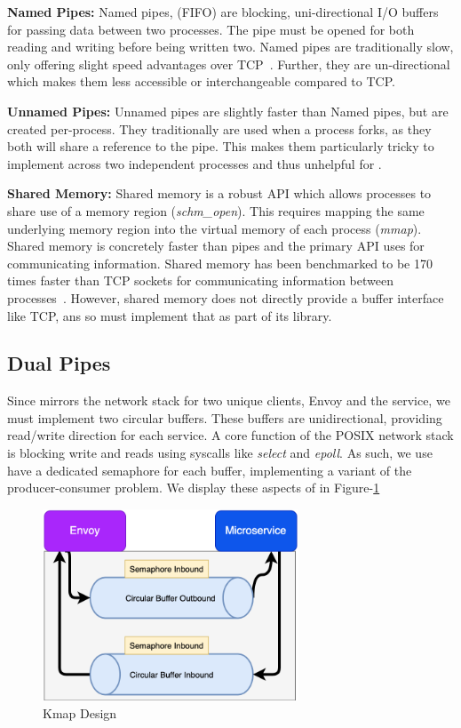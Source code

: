 \textbf{Named Pipes:}
Named pipes, (FIFO) are blocking, uni-directional I/O buffers for passing data between two processes.
The pipe must be opened for both reading and writing before being written two.
Named pipes are traditionally slow, only offering slight speed advantages over TCP~\cite{ipcperf}.
Further, they are un-directional which makes them less accessible or interchangeable compared to TCP.

\textbf{Unnamed Pipes:}
Unnamed pipes are slightly faster than Named pipes, but are created per-process.
They traditionally are used when a process forks, as they both will share a reference to the pipe.
This makes them particularly tricky to implement across two independent processes and thus unhelpful for \sysname.

\textbf{Shared Memory:}
Shared memory is a robust API which allows processes to share use of a memory region (\textit{schm\_open}).
This requires mapping the same underlying memory region into the virtual memory of each process (\textit{mmap}).
Shared memory is concretely faster than pipes and the primary API \sysname uses for communicating information.
Shared memory has been benchmarked to be 170 times faster than TCP sockets for communicating information between processes~\cite{ipcperf}.
However, shared memory does not directly provide a buffer interface like TCP, ans so \sysname must implement that as part of its library.

\subsection{Dual Pipes}
Since \sysname mirrors the network stack for two unique clients, Envoy and the service, we must implement two circular buffers.
These buffers are unidirectional, providing read/write direction for each service.
A core function of the POSIX network stack is blocking write and reads using syscalls like \textit{select} and \textit{epoll}.
As such, we use have a dedicated semaphore for each buffer, implementing a variant of the producer-consumer problem.
We display these aspects of \sysname in Figure-\ref{fig:closeup}


\begin{figure}[!htb]
    \begin{minipage}{0.5\textwidth}
        \centering
        \includegraphics[keepaspectratio=true,width=3in]{figures/design/kmap_closeup.png}
        \caption{Kmap Design}
        \label{fig:closeup}
    \end{minipage}%
\end{figure}


